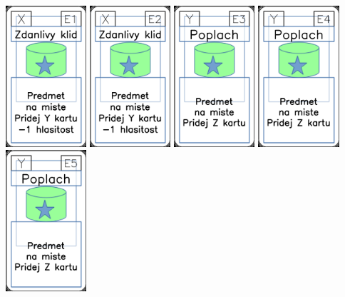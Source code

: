 \documentclass[a4paper]{article}
\begin{document}
	\includegraphics[width=3.0cm]{img-5_20}
	\includegraphics[width=3.0cm]{img-5_21}
	\includegraphics[width=3.0cm]{img-5_22}
	\includegraphics[width=3.0cm]{img-5_23}
	\includegraphics[width=3.0cm]{img-5_24}
\end{document}
